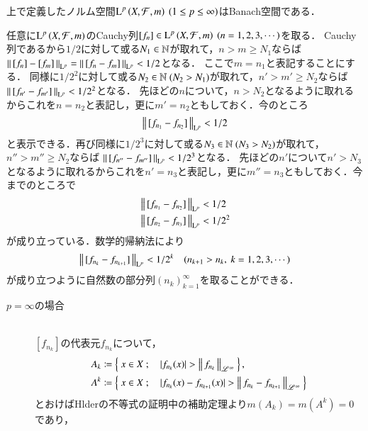 \begin{itembox}[l]{}
	\begin{prp}
		上で定義したノルム空間$\operatorname{L}^{p} \left(X,\mathcal{F},m\right)\ (1 \leq p \leq \infty)$はBanach空間である．
	\end{prp}
\end{itembox}
\begin{prf}
	任意に$\operatorname{L}^{p} \left(X,\mathcal{F},m\right)$のCauchy列$[f_n] \in \Lp{p}{X,\mathcal{F},m}\ (n=1,2,3,\cdots)$を取る．
	Cauchy列であるから$1/2$に対して或る$N_1 \in \mathbb{N}$が取れて，$n>m \geq N_1$ならば
	$\left\|\, [f_n]-[f_m]\, \right\|_{\mathrm{L}^p} = \left\|\, [f_n - f_m]\, \right\|_{\mathrm{L}^p} < 1/2$となる．
	ここで$m = n_1$と表記することにする．
	同様に$1/2^2$に対して或る$N_2 \in \mathbb{N}\ (N_2 > N_1)$が取れて，$n'>m' \geq N_2$ならば
	$\left\|\, [f_{n'} - f_{m'}]\, \right\|_{\mathrm{L}^p} < 1/2^2$となる．
	先ほどの$n$について，$n > N_2$となるように取れるからこれを$n = n_2$と表記し，更に$m' = n_2$ともしておく．今のところ
	\begin{align}
		\left\|\, [f_{n_1} - f_{n_2}]\, \right\|_{\mathrm{L}^p} < 1/2
	\end{align}
	と表示できる．再び同様に$1/2^3$に対して或る$N_3 \in \mathbb{N}\ (N_3 > N_2)$が取れて，$n''>m'' \geq N_2$ならば
	$\left\|\, [f_{n''} - f_{m''}]\, \right\|_{\mathrm{L}^p} < 1/2^3$となる．
	先ほどの$n'$について$n' > N_3$となるように取れるからこれを$n' = n_3$と表記し，更に$m'' = n_3$ともしておく．今までのところで
	\begin{align}
		&\left\|\, [f_{n_1} - f_{n_2}]\, \right\|_{\mathrm{L}^p} < 1/2 \\
		&\left\|\, [f_{n_2} - f_{n_3}]\, \right\|_{\mathrm{L}^p} < 1/2^2
	\end{align}
	が成り立っている．数学的帰納法により
	\begin{align}
		\left\|\, [f_{n_k} - f_{n_{k+1}}]\, \right\|_{\mathrm{L}^p} < 1/2^k \quad (n_{k+1} > n_k,\ k=1,2,3,\cdots) \label{ineq:Lp_banach_2}
	\end{align}
	が成り立つように自然数の部分列$(n_k)_{k=1}^{\infty}$を取ることができる．
	\begin{description}
		\item[$p = \infty$の場合]\mbox{}\\
			$[f_{n_k}]$の代表元$f_{n_k}$について，
			\begin{align}
				A_k &\coloneqq \left\{\ x \in X\ ;\quad |f_{n_k}(x)| > \left\|\, f_{n_k}\, \right\|_{\mathscr{L}^\infty}\ \right\}, \\
				A^k &\coloneqq \left\{\ x \in X\ ;\quad |f_{n_k}(x) - f_{n_{k+1}}(x)| > \left\|\, f_{n_k} - f_{n_{k+1}}\, \right\|_{\mathscr{L}^\infty}\ \right\}
			\end{align}
			とおけばHlderの不等式の証明中の補助定理より$m(A_k) = m(A^k) = 0$であり，

\end{description}
\end{prf}
